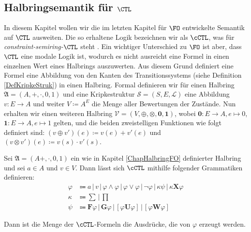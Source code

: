 
\subsection{Halbringsemantik für $\CTL$}
\label{ChapHalbringCTL}

In diesem Kapitel wollen wir die im letzten Kapitel für $\FO$ entwickelte Semantik auf $\CTL$ ausweiten. 
Die so erhaltene Logik bezeichnen wir als $\cCTL$, was für \textit{constraint-semiring-}$\CTL$ steht \cite{lluch2005quantitative}.
Ein wichtiger Unterschied zu $\FO$ ist aber, dass $\CTL$ eine modale Logik ist, wodurch es nicht ausreicht eine Formel in einen einzelnen Wert eines Halbrings auszuwerten.
Aus diesem Grund definiert eine Formel eine Abbildung von den Kanten des Transitionssystems (siehe Definition \ref{DefKripkeStruk}) in einen Halbring. 
Formal definieren wir für einen Halbring $\mathfrak{A}=(A,+,\cdot,0,1)$ und eine Kripkestruktur $\mathcal{S}=(S, E, \mathcal{L})$ eine Abbildung $v:E\to A$ und weiter $V\coloneqq A^E$ die Menge aller Bewertungen der Zustände.
Nun erhalten wir einen weiteren Halbring $\mathcal{V}=(V,\oplus,\otimes,\boldsymbol{0},\boldsymbol{1})$, wobei $\boldsymbol{0}:E\to A, e\mapsto 0$, $\boldsymbol{1}:E\to A,e\mapsto 1$ gelten, und die beiden zweistelligen Funktionen wie folgt definiert sind: $(v\oplus v')(e)\coloneqq v(e)+v'(e)$ und $(v\otimes v')(e)\coloneqq v(s)\cdot v'(s)$.

\begin{definition}
	Sei $\mathfrak{A}=(A+,\cdot,0,1)$ ein wie in Kapitel \ref{ChapHalbringFO} definierter Halbring und sei $a\in A$ und $v\in V$. Dann lässt sich $\cCTL$ mithilfe folgender Grammatiken definieren:
	\begin{align*}
		\varphi &\Coloneqq a \, | \, v \, | \, \varphi \land \varphi \, | \, \varphi \lor \varphi \, | \, \neg\varphi \, | \, \kappa \psi \, | \, \kappa \boldsymbol{X}\varphi \\
		\kappa &\Coloneqq \sum \, | \, \prod \\
		\psi &\Coloneqq \boldsymbol{F}\varphi \, | \, \boldsymbol{G}\varphi \, | \, [\varphi\boldsymbol{U}\varphi] \, | \, [\varphi\boldsymbol{W}\varphi]
	\end{align*}
	
	Dann ist die Menge der $\cCTL$-Formeln die Ausdrücke, die von $\varphi$ erzeugt werden. \cite{lluch2005quantitative}
\end{definition}

